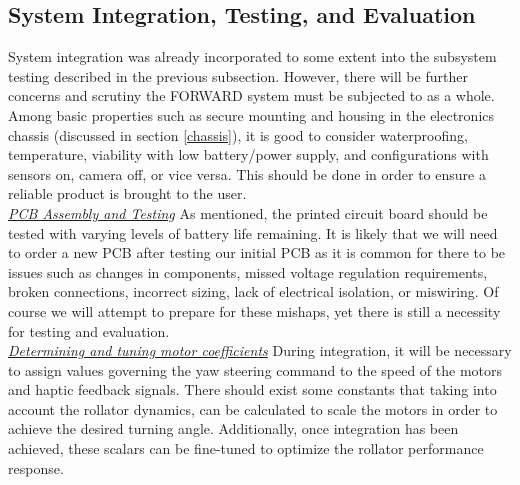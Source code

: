 \subsection{System Integration, Testing, and Evaluation}
\noindent System integration was already incorporated to some extent into the subsystem testing described in the previous subsection. However, there will be further concerns and scrutiny the FORWARD system must be subjected to as a whole. Among basic properties such as secure mounting and housing in the electronics chassis (discussed in section \ref{chassis}), it is good to consider waterproofing, temperature, viability with low battery/power supply, and configurations with sensors on, camera off, or vice versa. This should be done in order to ensure a reliable product is brought to the user.\\

\noindent \underline{\textit{PCB Assembly and Testing}}
\noindent As mentioned, the printed circuit board should be tested with varying levels of battery life remaining. It is likely that we will need to order a new PCB after testing our initial PCB as it is common for there to be issues such as changes in components, missed voltage regulation requirements, broken connections, incorrect sizing, lack of electrical isolation, or miswiring. Of course we will attempt to prepare for these mishaps, yet there is still a necessity  for testing and evaluation.\\

\noindent \underline{\textit{Determining and tuning motor coefficients}} During integration, it will be necessary to assign values governing the yaw steering command to the speed of the motors and haptic feedback signals. There should exist some constants that taking into account the rollator dynamics, can be calculated to scale the motors in order to achieve the desired turning angle. Additionally, once integration has been achieved, these scalars can be fine-tuned to optimize the rollator performance response.\\

